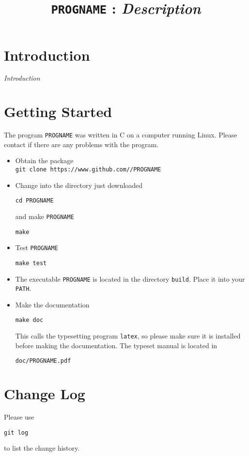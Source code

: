 \documentclass[a4paper, english]{article}
\begin{document}
\title{\texttt{PROGNAME} : \emph{Description}}
\author{}

\date{}
\maketitle

\section{Introduction} 
\emph{Introduction}

\section{Getting Started}
The program \texttt{PROGNAME} was written in C on a computer running Linux.
Please contact \texttt{} if there are any problems
with the program.
\begin{itemize}
\item Obtain the package\\
\texttt{git clone https://www.github.com//PROGNAME}
\item Change into the directory just downloaded
\begin{verbatim}
cd PROGNAME
\end{verbatim}
and make \texttt{PROGNAME}
\begin{verbatim}
make
\end{verbatim}
\item Test \texttt{PROGNAME}
\begin{verbatim}
make test
\end{verbatim}
\item The executable \texttt{PROGNAME} is located in the
  directory \texttt{build}. Place it into your \texttt{PATH}.
\item Make the documentation
\begin{verbatim}
make doc
\end{verbatim}
This calls the typesetting program \texttt{latex}, so please make sure
it is installed before making the documentation. The typeset manual is
located in
\begin{verbatim}
doc/PROGNAME.pdf
\end{verbatim}
\end{itemize}

\section{Change Log}
Please use
\begin{verbatim}
git log
\end{verbatim}
to list the change history.

\end{document}
